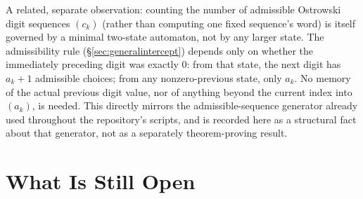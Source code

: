 \documentclass[11pt]{article}
\begin{document}
A related, separate observation: counting the number of admissible Ostrowski digit sequences $(c_k)$ (rather than computing one fixed sequence's word) is itself governed by a minimal two-state automaton, not by any larger state. The admissibility rule (\S\ref{sec:generalintercept}) depends only on whether the immediately preceding digit was exactly $0$: from that state, the next digit has $a_k+1$ admissible choices; from any nonzero-previous state, only $a_k$. No memory of the actual previous digit value, nor of anything beyond the current index into $(a_k)$, is needed. This directly mirrors the admissible-sequence generator already used throughout the repository's scripts, and is recorded here as a structural fact about that generator, not as a separately theorem-proving result.

\section{What Is Still Open}
\label{sec:open}
\end{document}
